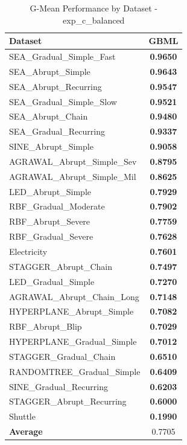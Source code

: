 \begin{table}[htbp]
\centering
\caption{G-Mean Performance by Dataset - exp_c_balanced}
\label{tab:gmean_exp_c_balanced}
\footnotesize
\begin{tabular}{lc}
\toprule
Dataset & GBML \\
\midrule
SEA_Gradual_Simple_Fast & \textbf{0.9650} \\
SEA_Abrupt_Simple & \textbf{0.9643} \\
SEA_Abrupt_Recurring & \textbf{0.9547} \\
SEA_Gradual_Simple_Slow & \textbf{0.9521} \\
SEA_Abrupt_Chain & \textbf{0.9480} \\
SEA_Gradual_Recurring & \textbf{0.9337} \\
SINE_Abrupt_Simple & \textbf{0.9058} \\
AGRAWAL_Abrupt_Simple_Sev & \textbf{0.8795} \\
AGRAWAL_Abrupt_Simple_Mil & \textbf{0.8625} \\
LED_Abrupt_Simple & \textbf{0.7929} \\
RBF_Gradual_Moderate & \textbf{0.7902} \\
RBF_Abrupt_Severe & \textbf{0.7759} \\
RBF_Gradual_Severe & \textbf{0.7628} \\
Electricity & \textbf{0.7601} \\
STAGGER_Abrupt_Chain & \textbf{0.7497} \\
LED_Gradual_Simple & \textbf{0.7270} \\
AGRAWAL_Abrupt_Chain_Long & \textbf{0.7148} \\
HYPERPLANE_Abrupt_Simple & \textbf{0.7082} \\
RBF_Abrupt_Blip & \textbf{0.7029} \\
HYPERPLANE_Gradual_Simple & \textbf{0.7012} \\
STAGGER_Gradual_Chain & \textbf{0.6510} \\
RANDOMTREE_Gradual_Simple & \textbf{0.6409} \\
SINE_Gradual_Recurring & \textbf{0.6203} \\
STAGGER_Abrupt_Recurring & \textbf{0.6000} \\
Shuttle & \textbf{0.1990} \\
\midrule
\textbf{Average} & 0.7705 \\
\bottomrule
\end{tabular}
\end{table}